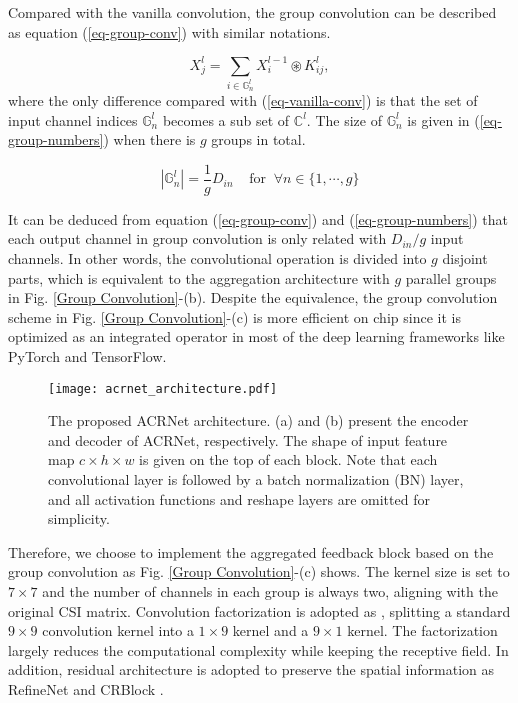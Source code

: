 \documentclass[12pt, draftclsnofoot, onecolumn]{IEEEtran}
\begin{document}
Compared with the vanilla convolution, the group convolution can be described as equation (\ref{eq-group-conv}) with similar notations.

\begin{equation} \label{eq-group-conv}
  X_j^l = \sum_{i \in \mathbb{G}^l_n} X_i^{l-1} \circledast K_{ij}^l,
\end{equation}
where the only difference compared with (\ref{eq-vanilla-conv}) is that the set of input channel indices $\mathbb{G}^l_n$ becomes a sub set of $\mathbb{C}^l$. The size of $\mathbb{G}^l_n$ is given in (\ref{eq-group-numbers}) when there is $g$ groups in total.

\begin{equation} \label{eq-group-numbers}
  \left|\mathbb{G}^l_n\right| = \frac{1}{g}D_{in} \;\;\;\;\text{for}\;\; \forall n \in \{1,\cdots,g\}
\end{equation}

It can be deduced from equation (\ref{eq-group-conv}) and (\ref{eq-group-numbers}) that each output channel in group convolution is only related with $D_{in}/g$ input channels. In other words, the convolutional operation is divided into $g$ disjoint parts, which is equivalent to the aggregation architecture with $g$ parallel groups in Fig. \ref{Group Convolution}-(b). Despite the equivalence, the group convolution scheme in Fig. \ref{Group Convolution}-(c) is more efficient on chip since it is optimized as an integrated operator in most of the deep learning frameworks like PyTorch and TensorFlow.

\begin{figure}[!t]
\centering
\texttt{[image: acrnet\_architecture.pdf]}
\caption{The proposed ACRNet architecture. (a) and (b) present the encoder and decoder of ACRNet, respectively. The shape of input feature map $c\times h\times w$ is given on the top of each block. Note that each convolutional layer is followed by a batch normalization (BN) layer, and all activation functions and reshape layers are omitted for simplicity.}
\label{ACRNet Architecture}
\end{figure}

Therefore, we choose to implement the aggregated feedback block based on the group convolution as Fig. \ref{Group Convolution}-(c) shows. The kernel size is set to $7\times 7$ and the number of channels in each group is always two, aligning with the original CSI matrix. Convolution factorization is adopted as \cite{lu2020multi}, splitting a standard $9 \times 9$ convolution kernel into a $1 \times 9$ kernel and a $9 \times 1$ kernel. The factorization largely reduces the computational complexity while keeping the receptive field. In addition, residual architecture is adopted to preserve the spatial information as RefineNet \cite{wen2018deep} and CRBlock \cite{lu2020multi}.
\end{document}
